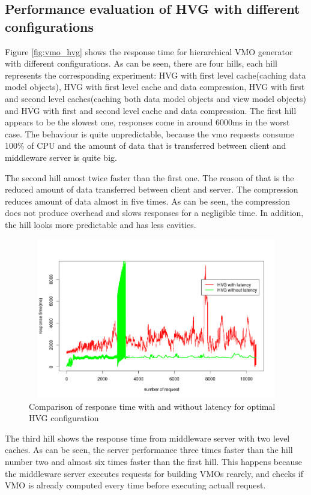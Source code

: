 \subsection{Performance evaluation of HVG with different configurations}

Figure \ref{fig:vmo_hvg} shows the response time for hierarchical VMO generator with different configurations. As can be seen, there are four hills, each hill represents the corresponding experiment: HVG with first level cache(caching data model objects), HVG with first level cache and data compression, HVG with first and second level caches(caching both data model objects and view model objects) and HVG with first and second level cache and data compression. The first hill appears to be the slowest one, responses come in around 6000ms in the worst case. The behaviour is quite unpredictable, because the vmo requests consume 100\% of CPU and the amount of data that is transferred between client and middleware server is quite big.


The second hill amost twice faster than the first one. The reason of that is the reduced amount of data transferred between client and server. The compression reduces amount of data almost in five times. As can be seen, the compression does not produce overhead and slows responses for a negligible time. In addition, the hill looks more predictable and has less cavities.  


\begin{figure}[h!]
    \centering
    \includegraphics[width=15cm,height=7cm,keepaspectratio]{images/hvg_latency_comparison.png}
    \caption{Comparison of response time with and without latency for optimal HVG configuration}
    \label{fig:hvg_comparison}
\end{figure}


The third hill shows the response time from middleware server with two level caches. As can be seen, the server performance three times faster than the hill number two and almost six times faster than the first hill. This happens because the middleware server executes requests for building VMOs rearely, and checks if VMO is already computed every time before executing actuall request. 

